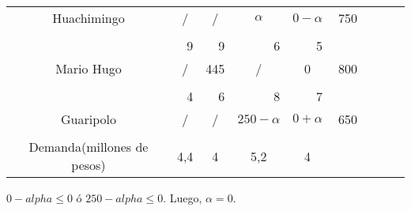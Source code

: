 \documentclass[12pt,letterpaper]{article}
\begin{document}
\begin{center}
\begin{tabular}{ccc|ccc|ccc|ccc|ccc|ccc|ccc}
\multicolumn{3}{c|}{Huachimingo} & \multicolumn{3}{c|}{/} & \multicolumn{3}{c|}{/} & \multicolumn{3}{c|}{$\alpha$} & \multicolumn{3}{c|}{$0-\alpha$}& \multicolumn{3}{c}{750}\\
\multicolumn{3}{c|}{} & \multicolumn{3}{c|}{} & \multicolumn{3}{c|}{} & \multicolumn{3}{c|}{} & \multicolumn{3}{c|}{}\\
\cline{1-15}
\multicolumn{3}{c|}{} & \multicolumn{3}{r|}{9} & \multicolumn{3}{r|}{9} & \multicolumn{3}{r|}{6} & \multicolumn{3}{r|}{5} \\
\multicolumn{3}{c|}{Mario Hugo} & \multicolumn{3}{c|}{/} & \multicolumn{3}{c|}{445} & \multicolumn{3}{c|}{/} & \multicolumn{3}{c|}{0}& \multicolumn{3}{c}{800}\\
\multicolumn{3}{c|}{} & \multicolumn{3}{c|}{} & \multicolumn{3}{c|}{} & \multicolumn{3}{c|}{} & \multicolumn{3}{c|}{}\\
\cline{1-15}
\multicolumn{3}{c|}{} & \multicolumn{3}{r|}{4} & \multicolumn{3}{r|}{6} & \multicolumn{3}{r|}{8} & \multicolumn{3}{r|}{7} \\
\multicolumn{3}{c|}{Guaripolo} & \multicolumn{3}{c|}{/} & \multicolumn{3}{c|}{/} & \multicolumn{3}{c|}{$250-\alpha$} & \multicolumn{3}{c|}{$0+\alpha$}& \multicolumn{3}{c}{650}\\
\multicolumn{3}{c|}{} & \multicolumn{3}{c|}{} & \multicolumn{3}{c|}{} & \multicolumn{3}{c|}{} & \multicolumn{3}{c|}{}\\
\cline{1-15}
\multicolumn{3}{c|}{Demanda(millones de pesos)} & \multicolumn{3}{c|}{4,4} & \multicolumn{3}{c|}{4} & \multicolumn{3}{c|}{5,2}& \multicolumn{3}{c|}{4} & \multicolumn{3}{c}{}\\

\end{tabular}
\end{center}
$0-alpha\leq 0$ ó $250-alpha\leq 0$. Luego, $\alpha = 0$. \\
\end{document}
